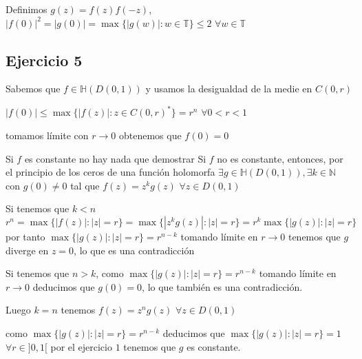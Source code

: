 Definimos $g(z) = f(z)f(-z)$, 
$|f(0)|^2 = |g(0)| = \max\{ |g(w)| : w\in\mathbb{T} \} \leq 2$ $\forall w\in\mathbb{T}$


\subsection{Ejercicio 5}
Sabemos que $f\in\mathbb{H}(D(0,1))$ y usamos la desigualdad de la medie en $C(0,r)$ 

$|f(0)| \leq \max\{ |f(z)| : z\in C(0,r)^{\ast} \} = r^n$ $\forall 0<r<1$

tomamos límite con $r\rightarrow 0$ obtenemos que $f(0)=0$

Si $f$ es constante no hay nada que demostrar
Si $f$ no es constante, entonces, por el principio de los ceros de una función holomorfa $\exists g\in\mathbb{H}(D(0,1)), \exists k\in\mathbb{N}$ con $g(0) \not=0$ tal que $f(z) = z^kg(z)$ $\forall z\in D(0,1)$

Si tenemos que $k<n$
$r^n = \max\{ |f(z)| : |z|=r \} = \max\{ |z^kg(z)| : |z|=r \} = r^k \max\{ |g(z)| : |z|=r \}$
por tanto
$\max\{ |g(z)| : |z|=r \} = r^{n-k}$ tomando límite en $r\rightarrow0$ tenemos que $g$ diverge en $z=0$, lo que es una contradicción

Si tenemos que $n>k$,
como $\max\{ |g(z)| : |z|=r \} = r^{n-k}$ tomando límite en $r\rightarrow 0$ deducimos que $g(0)=0$, lo que también es una contradicción.

Luego $k=n$ tenemos $f(z)=z^ng(z)$ $\forall z\in D(0,1)$

como $\max\{ |g(z)| : |z|=r \} = r^{n-k}$ deducimos que $\max\{ |g(z)| : |z|=r \} = 1$ $\forall r\in]0,1[$
por el ejercicio $1$ tenemos que $g$ es constante.



\begin{comment}
	ENUNCIADO
	Si $f\in\mathbb{H}(\mathbb{C})$ y es inyectiva, ¿Qué se puede decir de $f$?
	
	SOLUCIÓN
	Como $f$ es entera tenemos que $f(z) = \sum_{n=0}^{\infty} \frac{f^{(n)}(0)}{n!}z^n \forall z\in\mathbb{C}$
	
	Si $f$ es un polinomio de grado $k$
	si $k\geq 2$ el teorema fundamental del álgebra nos dice que $f$ tiene al menos $2$ ceros (contando multiplicidad), los ceros no pueden ser distintos porque $f$ es inyectiva, por tanto $f$ tiene un cero de orden al menos $2$.
	
	$f$ no es inyectiva en un entorno de un punto donde se anule la derivada, por tanto tenemos una contradicción ya que $f$ es inyectiva.
	
	Si $f$ es entera no polinómica, como consecuencia del teorema de Casorati $f(\mathbb{C}\backslash\overline{D}(0,R))$ es denso en $\mathbb{C}$
	
	Por el teorema de la aplicación abierta sabemos que $f(D(0,r))$
	Entonces hay dos puntos donde la función vale lo mismo, por tanto no puede ser inyectiva.
	
\end{comment}

